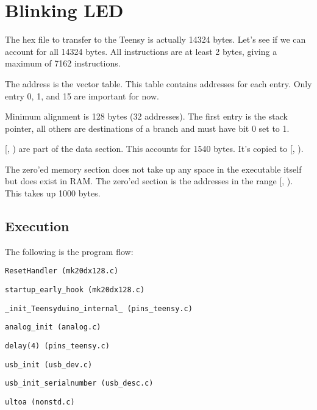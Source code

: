 \newpage
\section{Blinking LED}

The hex file to transfer to the Teensy is actually 14324 bytes.
Let's see if we can account for all 14324 bytes.
All instructions are at least 2 bytes, giving a maximum of 7162 instructions.

The address  is the vector table. This table contains
addresses for each entry. Only entry 0, 1, and 15 are important for now.

Minimum alignment is 128 bytes (32 addresses). The first entry is the stack
pointer, all others are destinations of a branch and must have bit 0 set to 1.

[, ) are part of the data
section. This accounts for 1540 bytes. It's copied to
[, ).

The zero'ed memory section does not take up any space in the executable itself
but does exist in RAM. The zero'ed section is the addresses in the range
[, ).
This takes up 1000 bytes.

\subsection{Execution}

The following is the program flow:

\indent \texttt{ResetHandler (mk20dx128.c)}

\hspace{2mm} \texttt{startup\_early\_hook (mk20dx128.c)}

\hspace{2mm} \texttt{\_init\_Teensyduino\_internal\_ (pins\_teensy.c)}

\hspace{4mm} \texttt{analog\_init (analog.c)}

\hspace{4mm} \texttt{delay(4) (pins\_teensy.c)}

\hspace{4mm} \texttt{usb\_init (usb\_dev.c)}

\hspace{6mm} \texttt{usb\_init\_serialnumber (usb\_desc.c)}

\hspace{8mm} \texttt{ultoa (nonstd.c)}

